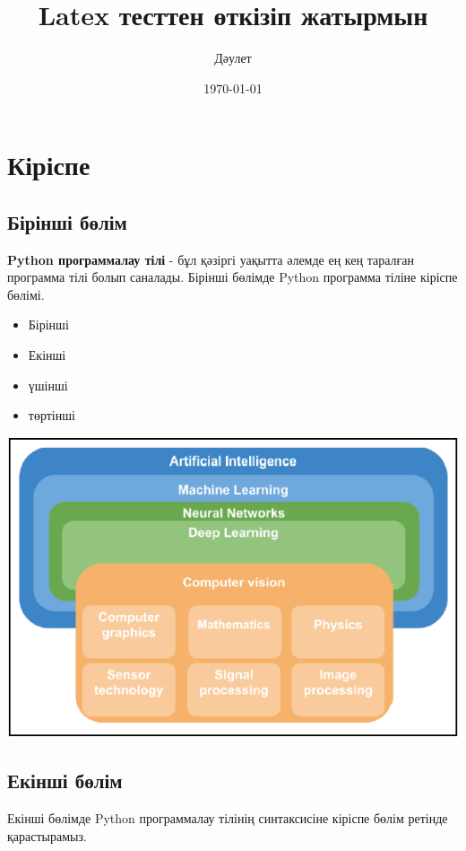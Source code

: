 \documentclass[14pt, a4paper]{book}
\author{Дәулет}
\title{Latex тесттен өткізіп жатырмын}
\date{\today}
\begin{document}
    \maketitle

    \tableofcontents{}
    \clearpage

    \chapter{Кіріспе}
    \section{Бірінші бөлім}
    \textbf{Python программалау тілі} - бұл қәзіргі уақытта әлемде ең кең 
    таралған программа тілі болып саналады. Бірінші бөлімде Python 
    программа тіліне кіріспе бөлімі.

    \begin{itemize}
        \item Бірінші
        \item Екінші
        \item үшінші
        \item төртінші
    \end{itemize}

    \includegraphics[scale=0.6]{images/cv-1.png}

    \section{Екінші бөлім}
    Екінші бөлімде Python программалау тілінің синтаксисіне кіріспе
    бөлім ретінде қарастырамыз.
\end{document}
